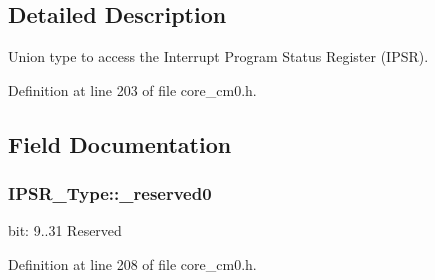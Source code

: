 \subsection{Detailed Description}
Union type to access the Interrupt Program Status Register (I\-P\-S\-R). 

Definition at line 203 of file core\-\_\-cm0.\-h.



\subsection{Field Documentation}
\hypertarget{union_i_p_s_r___type_ad2eb0a06de4f03f58874a727716aa9aa}{
\subsubsection[{\-\_\-reserved0}]{ I\-P\-S\-R\-\_\-\-Type\-::\-\_\-reserved0}}\label{union_i_p_s_r___type_ad2eb0a06de4f03f58874a727716aa9aa}
bit\-: 9..31 Reserved 

Definition at line 208 of file core\-\_\-cm0.\-h.

